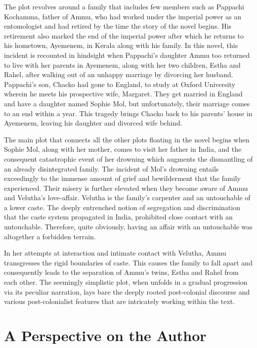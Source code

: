 The plot revolves around a family that includes few members such as Pappachi Kochamma, father of Ammu, who had worked under the imperial power as an entomologist and had retired by the time the story of the novel begins. His retirement also marked the end of the imperial power after which he returns to his hometown, Ayemenem, in Kerala along with his family. In this novel, this incident is recounted in hindsight when Pappachi’s daughter Ammu too returned to live with her parents in Ayemenem, along with her two children, Estha and Rahel, after walking out of an unhappy marriage by divorcing her husband. Pappachi’s son, Chacko had gone to England, to study at Oxford University wherein he meets his prospective wife, Margaret. They get married in England and have a daughter named Sophie Mol, but unfortunately, their marriage comes to an end within a year. This tragedy brings Chacko back to his parents’ house in Ayemenem, leaving his daughter and divorced wife behind.

The main plot that connects all the other plots floating in the novel begins when Sophie Mol, along with her mother, comes to visit her father in India, and the consequent catastrophic event of her drowning which augments the dismantling of an already disintegrated family. The incident of Mol’s drowning entails exceedingly to the immense amount of grief and bewilderment that the family experienced. Their misery is further elevated when they become aware of Ammu and Velutha’s love-affair. Velutha is the family’s carpenter and an untouchable of a lower caste. The deeply entrenched notion of segregation and discrimination that the caste system propagated in India, prohibited close contact with an untouchable. Therefore, quite obviously, having an affair with an untouchable was altogether a forbidden terrain.

In her attempts at interaction and intimate contact with Velutha, Ammu transgresses the rigid boundaries of caste. This causes the family to fall apart and consequently leads to the separation of Ammu’s twins, Estha and Rahel from each other. The seemingly simplistic plot, when unfolds in a gradual progression via its peculiar narration, lays bare the deeply rooted post-colonial discourse and various post-colonialist features that are intricately working within the text. \parencite{Nayar}

\section{A Perspective on the Author}

